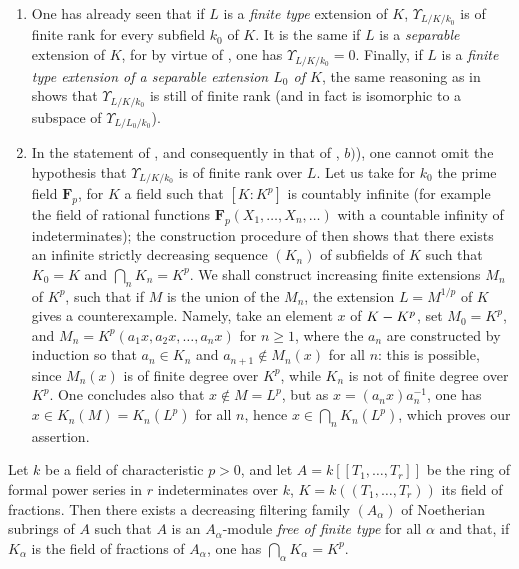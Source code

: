 \begin{remarks}[21.8.7]
\label{0.21.8.7}
\begin{enumerate}
  \item[(i)] One has already seen  that if $L$ is a \emph{finite type} extension of $K$, $\Upsilon_{L/K/k_0}$ is of finite rank for every subfield $k_0$ of $K$.
    It is the same if $L$ is a \emph{separable} extension of $K$, for by virtue of , one has $\Upsilon_{L/K/k_0}=0$.
    Finally, if $L$ is a \emph{finite type extension of a separable extension $L_0$ of $K$}, the same reasoning as in  shows that $\Upsilon_{L/K/k_0}$ is still of finite rank (and in fact is isomorphic to a subspace of $\Upsilon_{L/L_0/k_0}$).
  \item[(ii)] In the statement of , and consequently in that of , $b)$), one cannot omit the hypothesis that $\Upsilon_{L/K/k_0}$ is of finite rank over $L$.
    Let us take for $k_0$ the prime field $\mathbf{F}_p$, for $K$ a field such that $[K:K^p]$ is countably infinite (for example the field of rational functions $\mathbf{F}_p(X_1,\ldots,X_n,\ldots)$ with a countable infinity of indeterminates);
    the construction procedure of  then shows that there exists an infinite strictly decreasing sequence $(K_n)$ of subfields of $K$ such that $K_0=K$ and $\bigcap_n K_n=K^p$.
    We shall construct increasing finite extensions $M_n$ of $K^p$, such that if $M$ is the union of the $M_n$, the extension $L=M^{1/p}$ of $K$ gives  a counterexample.
    Namely, take an element $x$ of $K- K^p$, set $M_0=K^p$, and $M_n=K^p(a_1 x,a_2 x,\ldots,a_n x)$ for $n\geqslant 1$, where the $a_n$ are constructed by induction so that $a_n\in K_n$ and $a_{n+1}\notin M_n(x)$ for all $n$: this is possible, since $M_n(x)$ is of finite degree over $K^p$, while $K_n$ is not of finite degree over $K^p$.
    One concludes also that $x\notin M=L^p$, but as $x=(a_n x)a_n^{-1}$, one has $x\in K_n(M)=K_n(L^p)$ for all $n$, hence $x\in\bigcap_n K_n(L^p)$, which proves our assertion.
\end{enumerate}
\end{remarks}

\begin{proposition}[21.8.8]
\label{0.21.8.8}
Let $k$ be a field of characteristic $p>0$, and let $A=k[[T_1,\ldots,T_r]]$ be the ring of formal power series in $r$ indeterminates over $k$, $K=k((T_1,\ldots,T_r))$ its field of fractions.
Then there exists a decreasing filtering family $(A_\alpha)$ of Noetherian subrings of $A$ such that $A$ is an $A_\alpha$-module \emph{free of finite type} for all $\alpha$ and that, if $K_\alpha$ is the field of fractions of $A_\alpha$, one has $\bigcap_\alpha K_\alpha=K^p$.
\end{proposition}

